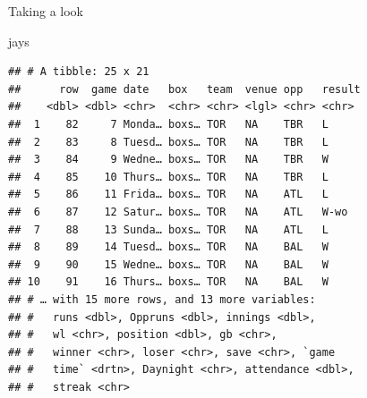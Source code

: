 \documentclass[ignorenonframetext,]{beamer}
\newenvironment{Shaded}{\begin{snugshade}}{\end{snugshade}}
\newcommand{\NormalTok}[1]{#1}
\begin{document}
\begin{frame}[fragile]{Taking a look}
\protect\hypertarget{taking-a-look}{}

\scriptsize

\begin{Shaded}
\begin{Highlighting}[]
\NormalTok{jays}
\end{Highlighting}
\end{Shaded}

\begin{verbatim}
## # A tibble: 25 x 21
##      row  game date   box   team  venue opp   result
##    <dbl> <dbl> <chr>  <chr> <chr> <lgl> <chr> <chr> 
##  1    82     7 Monda… boxs… TOR   NA    TBR   L     
##  2    83     8 Tuesd… boxs… TOR   NA    TBR   L     
##  3    84     9 Wedne… boxs… TOR   NA    TBR   W     
##  4    85    10 Thurs… boxs… TOR   NA    TBR   L     
##  5    86    11 Frida… boxs… TOR   NA    ATL   L     
##  6    87    12 Satur… boxs… TOR   NA    ATL   W-wo  
##  7    88    13 Sunda… boxs… TOR   NA    ATL   L     
##  8    89    14 Tuesd… boxs… TOR   NA    BAL   W     
##  9    90    15 Wedne… boxs… TOR   NA    BAL   W     
## 10    91    16 Thurs… boxs… TOR   NA    BAL   W     
## # … with 15 more rows, and 13 more variables:
## #   runs <dbl>, Oppruns <dbl>, innings <dbl>,
## #   wl <chr>, position <dbl>, gb <chr>,
## #   winner <chr>, loser <chr>, save <chr>, `game
## #   time` <drtn>, Daynight <chr>, attendance <dbl>,
## #   streak <chr>
\end{verbatim}

\normalsize

\end{frame}
\end{document}
